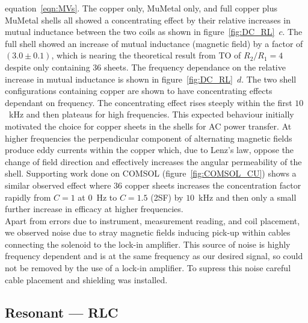 \documentclass[11pt]{iopart}
\begin{document}
equation~\ref{eqn:MVs}. The copper only, MuMetal only, and full copper
plus MuMetal shells all showed a concentrating effect by their
relative increases in mutual inductance between the two coils as shown
in figure~\ref{fig:DC_RL}~$c$. The full shell showed an increase of
mutual inductance (magnetic field) by a factor of $(3.0\pm0.1)$, which
is nearing the theoretical result from TO of $R_2/R_1 = 4$ despite
only containing $36$ sheets. The frequency dependance on the relative
increase in mutual inductance is shown in
figure~\ref{fig:DC_RL}~$d$. The two shell configurations containing
copper are shown to have concentrating effects dependant on
frequency. The concentrating effect rises steeply within the first
$10$~kHz and then plateaus for high frequencies.  This expected
behaviour initially motivated the choice for copper sheets in the
shells for AC power transfer. At higher frequencies the perpendicular
component of alternating magnetic fields produce eddy currents within
the copper which, due to Lenz's law, oppose the change of field
direction and effectively increases the angular permeability of the
shell.  Supporting work done on COMSOL (figure~\ref{fig:COMSOL_CU})
shows a similar observed effect where 36 copper sheets increases the
concentration factor rapidly from $C = 1$ at $0$~Hz to $C = 1.5$ (2SF)
by $10$~kHz and then only a small further increase in efficacy at
higher frequencies.\\ Apart from errors due to instrument, measurement
reading, and coil placement, we observed noise due to stray magnetic
fields inducing pick-up within cables connecting the solenoid to the
lock-in amplifier. This source of noise is highly frequency dependent
and is at the same frequency as our desired signal, so could not be
removed by the use of a lock-in amplifier. To supress this noise
careful cable placement and shielding was installed. \\

\subsection*{Resonant --- RLC}
\end{document}
